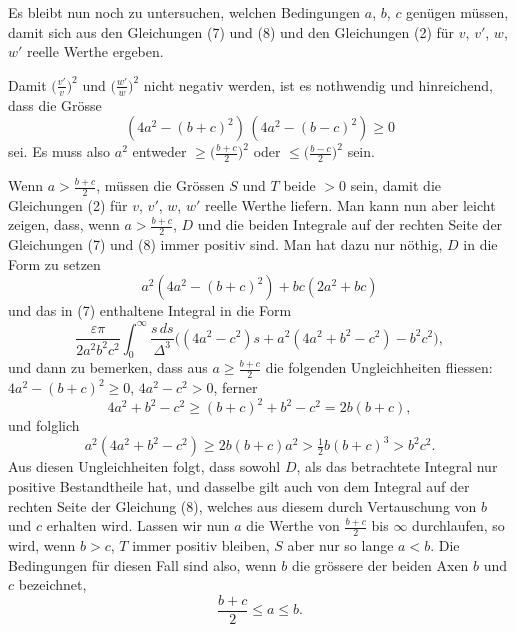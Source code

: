 \documentclass[12pt,a4paper]{article}
\begin{document}
Es bleibt nun noch zu untersuchen, welchen Bedingungen $a$, $b$, $c$ genügen müssen, damit sich aus den Gleichungen (7) und (8) und den Gleichungen (2) für $v$, $v'$, $w$, $w'$ reelle Werthe ergeben.

Damit $\bigl(\frac{v'}{v}\bigr)^2$ und $\bigl(\frac{w'}{w}\bigr)^2$ nicht negativ werden, ist es nothwendig und hinreichend, dass die Grösse
\[ (4a^2 - (b+c)^2)\,(4a^2 - (b-c)^2) \geq 0 \]
sei. Es muss also $a^2$ entweder $\geq\bigl(\frac{b+c}{2}\bigr)^2$ oder $\leq\bigl(\frac{b-c}{2}\bigr)^2$ sein.

Wenn $a > \frac{b+c}{2}$, müssen die Grössen $S$ und $T$ beide $> 0$ sein, damit die Gleichungen (2) für $v$, $v'$, $w$, $w'$ reelle Werthe liefern. Man kann nun aber leicht zeigen, dass, wenn $a > \frac{b+c}{2}$, $D$ und die beiden Integrale auf der rechten Seite der Gleichungen (7) und (8) immer positiv sind. Man hat dazu nur nöthig, $D$ in die Form zu setzen
\[ a^2(4a^2 - (b+c)^2) + bc(2a^2 + bc) \]
und das in (7) enthaltene Integral in die Form
\[ \frac{\varepsilon\pi}{2a^2b^2c^2}\int_0^{\infty}\!\frac{s\,ds}{\Delta^3}\bigl((4a^2-c^2)s + a^2(4a^2+b^2-c^2) - b^2c^2\bigr), \]
und dann zu bemerken, dass aus $a \geq \frac{b+c}{2}$ die folgenden Ungleichheiten fliessen: $4a^2 - (b+c)^2 \geq 0$, $4a^2 - c^2 > 0$, ferner
\[ 4a^2 + b^2 - c^2 \geq (b+c)^2 + b^2 - c^2 = 2b(b+c), \]
und folglich
\[ a^2(4a^2 + b^2 - c^2) \geq 2b(b+c)a^2 > \tfrac{1}{2}b(b+c)^3 > b^2c^2. \]
Aus diesen Ungleichheiten folgt, dass sowohl $D$, als das betrachtete Integral nur positive Bestandtheile hat, und dasselbe gilt auch von dem Integral auf der rechten Seite der Gleichung (8), welches aus diesem durch Vertauschung von $b$ und $c$ erhalten wird. Lassen wir nun $a$ die Werthe von $\frac{b+c}{2}$ bis $\infty$ durchlaufen, so wird, wenn $b > c$, $T$ immer positiv bleiben, $S$ aber nur so lange $a < b$. Die Bedingungen für diesen Fall sind also, wenn $b$ die grössere der beiden Axen $b$ und $c$ bezeichnet,
\begin{equation}
\tag{I} \frac{b+c}{2} \leq a \leq b. \end{equation}
\end{document}
